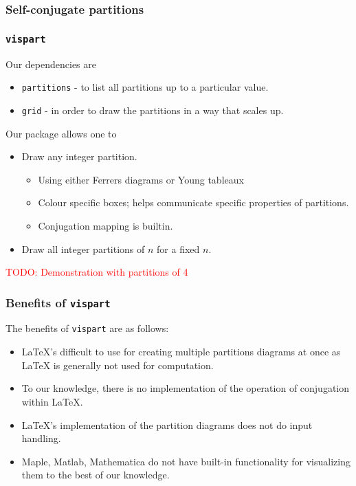 \documentclass{beamer}
\newcommand*{\TODO}[1]{\textcolor{red}{TODO: #1}}
\begin{document}
\begin{frame}
\frametitle{Self-conjugate partitions}

\end{frame}

\begin{frame}
\frametitle{\texttt{vispart} }	
Our dependencies are 
\begin{itemize}
\item \texttt{partitions} - to list all partitions up to a particular value.
\item \texttt{grid} - in order to draw the partitions in a way that scales up.
\end{itemize}	

Our package allows one to 
\begin{itemize}
\item Draw any integer partition.
\begin{itemize}
\item Using either Ferrers diagrams or Young tableaux
\item Colour specific boxes; helps communicate specific properties of partitions.
\item Conjugation mapping is builtin.
\end{itemize}
\item Draw all integer partitions of $n$ for a fixed $n$.
\end{itemize}

\TODO{Demonstration with partitions of 4}

\end{frame}

\begin{frame}
\frametitle{Benefits of \texttt{vispart}}	
The benefits of \texttt{vispart} are as follows:

\begin{itemize}
	\item LaTeX's difficult to use for creating multiple partitions diagrams at once as LaTeX is generally not used for computation.
	\item To our knowledge, there is no implementation of the operation of conjugation within LaTeX.
	\item LaTeX's implementation of the partition diagrams does not do input handling.
	\item Maple, Matlab, Mathematica do not have built-in functionality for visualizing them to the best of our knowledge.
\end{itemize}
\end{frame}
\end{document}
